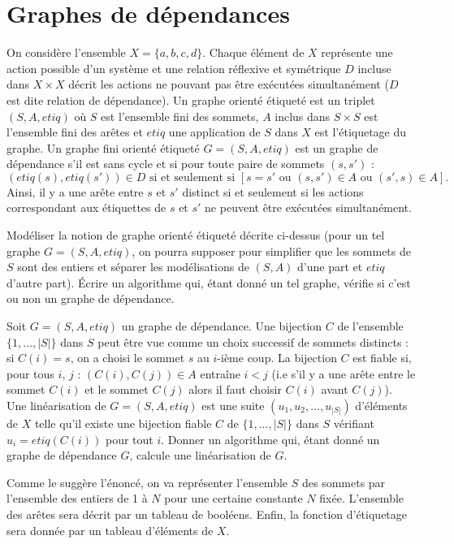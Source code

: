 \renewcommand{\SourceFile}{5-graphes/src/5-5.ml}

\section{Graphes de dépendances}

On considère l'ensemble $X=\{a,b,c,d\}$. Chaque élément de $X$ représente une action possible d'un système et une relation réflexive et symétrique $D$ incluse dans $X \times X$ décrit les actions ne pouvant pas être exécutées simultanément ($D$ est dite relation de dépendance). Un graphe orienté étiqueté est un triplet $(S,A,etiq)$ où $S$ est l'ensemble fini des sommets, $A$ inclus dans $S \times S$ est l'ensemble fini des arêtes et $etiq$ une application de $S$ dans $X$ est l'étiquetage du graphe. Un graphe fini orienté étiqueté $G=(S,A,etiq)$ est un graphe de dépendance s'il est sans cycle et si pour toute paire de sommets $(s,s')$ :
\[
    (etiq(s),etiq(s')) \in D \textrm{ si et seulement si } [s=s' \textrm{ ou } (s,s') \in A \textrm{ ou } (s',s) \in A].
\]
Ainsi, il y a une arête entre $s$ et $s'$ distinct si et seulement si les actions correspondant aux étiquettes de $s$ et $s'$ ne peuvent être exécutées simultanément.

\Q
Modéliser la notion de graphe orienté étiqueté décrite ci-dessus (pour un tel graphe $G=(S,A,etiq)$, on pourra supposer pour simplifier que les sommets de $S$ sont des entiers et séparer les modélisations de $(S,A)$ d'une part et $etiq$ d'autre part). Écrire un algorithme qui, étant donné un tel graphe, vérifie si c'est ou non un graphe de dépendance.

\Q
Soit $G=(S,A,etiq)$ un graphe de dépendance. Une bijection $C$ de l'ensemble $\{1,...,|S|\}$ dans $S$ peut être vue comme un choix successif de sommets distincts : si $C(i)=s$, on a choisi le sommet $s$ au $i$-ième coup. La bijection $C$ est fiable si, pour tous $i$, $j$ : $(C(i),C(j)) \in A$ entraîne $i < j$ (i.e s'il y a une arête entre le sommet $C(i)$ et le sommet $C(j)$ alors il faut choisir $C(i)$ avant $C(j)$). Une linéarisation de $G=(S,A,etiq)$ est une suite $(u_1,u_2,...,u_{|S|})$ d'éléments de $X$ telle qu'il existe une bijection fiable $C$ de $\{1,...,|S|\}$ dans $S$ vérifiant $u_i=etiq(C(i))$ pour tout $i$. Donner un algorithme qui, étant donné un graphe de dépendance $G$, calcule une linéarisation de $G$.

\Corrige

\Q
Comme le suggère l'énoncé, on va représenter l'ensemble $S$ des sommets par l'ensemble des entiers de 1 à $N$ pour une certaine constante $N$ fixée. L'ensemble des arêtes sera décrit par un tableau de booléens. Enfin, la fonction d'étiquetage sera donnée par un tableau d'éléments de $X$.
\medskip

